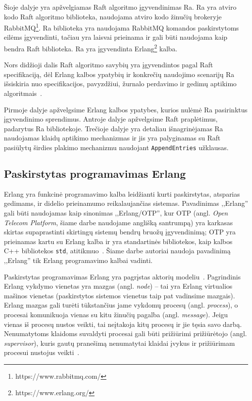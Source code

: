\documentclass{VUMIFPSkursinis}
\begin{document}
Šioje dalyje yra apžvelgiamas Raft algoritmo įgyvendinimas Ra. Ra yra atviro kodo Raft algoritmo biblioteka, naudojama atviro kodo žinučių brokeryje RabbitMQ\footnote{https://www.rabbitmq.com/}. Ra biblioteka yra naudojama RabbitMQ komandos paskirstytoms eilėms įgyvendinti, tačiau yra laisvai prieinama ir gali būti naudojama kaip bendra Raft biblioteka. Ra yra įgyvendinta Erlang\footnote{https://www.erlang.org/} kalba.

Nors didžioji dalis Raft algoritmo savybių yra įgyvendintos pagal Raft specifikaciją, dėl Erlang kalbos ypatybių ir konkrečių naudojimo scenarijų Ra išsiskiria nuo specifikacijos, pavyzdžiui, žurnalo perdavimo ir gedimų aptikimo algoritmais~\cite{rabbitmqra}.

Pirmoje dalyje apžvelgsime Erlang kalbos ypatybes, kurios nulėmė Ra pasirinktus įgyvendinimo sprendimus. Antroje dalyje apžvelgsime Raft praplėtimus, padarytus Ra bibliotekoje. Trečioje dalyje yra detaliau išnagrinėjamas Ra naudojamas klaidų aptikimo mechanizmas ir jis yra palyginamas su Raft pasiūlytų širdies plakimo mechanizmu naudojant \texttt{AppendEntries} užklausas.

\subsection{Paskirstytas programavimas Erlang}

Erlang yra funkcinė programavimo kalba leidžianti kurti paskirstytas, atsparias gedimams, ir didelio prieinamumo reikalaujančias sistemas. Pavadinimas ,,Erlang'' gali būti naudojamas kaip sinonimas ,,Erlang/OTP'', kur OTP (angl. \textit{Open Telecom Platform}, šiame darbe naudojame anglišką santrumpą) yra karkasas skirtas supaprastinti skirtingų sistemų bendrų bruožų įgyvendinimą; OTP yra prieinamas kartu su Erlang kalba ir yra standartinės bibliotekos, kaip kalbos C++ bibliotekos \texttt{std}, atitikmuo~\cite{erlang_introduction}. Šiame darbe autoriai naudoja pavadinimą ,,Erlang'' tik Erlang programavimo kalbai vadinti.

Paskirstytas programavimas Erlang yra pagrįstas aktorių modeliu~\cite{farrugia_towards_nodate, agha_actors_1985}. Pagrindinis Erlang vykdymo vienetas yra mazgas (angl. \textit{node}) -- tai yra Erlang virtualios mašinos vienetas (paskirstytos sistemos vienetus taip pat vadinsime mazgais). Erlang mazgas gali turėti tūkstančius jame vykdomų procesų (angl. \textit{process}), o procesai komunikuoja vienas su kitu žinučių pagalba (angl. \textit{message}). Jeigu vienas iš procesų nustos veikti, tai neįtakoja kitų procesų ir jie tęsia savo darbą. Nenumatytoms klaidoms suvaldyti procesai gali būti prižiūrimi prižiūrėtojo (angl. \textit{supervisor}), kuris gautų pranešimą nenumatytai klaidai įvykus ir prižiūrimam procesui nustojus veikti~\cite{erlang_distributed}.
\end{document}
